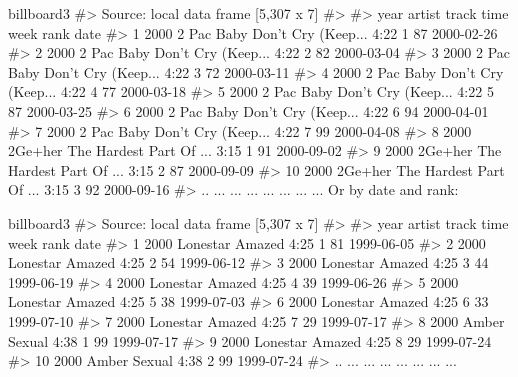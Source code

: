 billboard3 %
#> Source: local data frame [5,307 x 7]
#> 
#>    year  artist                   track time week rank       date
#> 1  2000   2 Pac Baby Don't Cry (Keep... 4:22    1   87 2000-02-26
#> 2  2000   2 Pac Baby Don't Cry (Keep... 4:22    2   82 2000-03-04
#> 3  2000   2 Pac Baby Don't Cry (Keep... 4:22    3   72 2000-03-11
#> 4  2000   2 Pac Baby Don't Cry (Keep... 4:22    4   77 2000-03-18
#> 5  2000   2 Pac Baby Don't Cry (Keep... 4:22    5   87 2000-03-25
#> 6  2000   2 Pac Baby Don't Cry (Keep... 4:22    6   94 2000-04-01
#> 7  2000   2 Pac Baby Don't Cry (Keep... 4:22    7   99 2000-04-08
#> 8  2000 2Ge+her The Hardest Part Of ... 3:15    1   91 2000-09-02
#> 9  2000 2Ge+her The Hardest Part Of ... 3:15    2   87 2000-09-09
#> 10 2000 2Ge+her The Hardest Part Of ... 3:15    3   92 2000-09-16
#> ..  ...     ...                     ...  ...  ...  ...        ...
Or by date and rank:

billboard3 %
#> Source: local data frame [5,307 x 7]
#> 
#>    year   artist  track time week rank       date
#> 1  2000 Lonestar Amazed 4:25    1   81 1999-06-05
#> 2  2000 Lonestar Amazed 4:25    2   54 1999-06-12
#> 3  2000 Lonestar Amazed 4:25    3   44 1999-06-19
#> 4  2000 Lonestar Amazed 4:25    4   39 1999-06-26
#> 5  2000 Lonestar Amazed 4:25    5   38 1999-07-03
#> 6  2000 Lonestar Amazed 4:25    6   33 1999-07-10
#> 7  2000 Lonestar Amazed 4:25    7   29 1999-07-17
#> 8  2000    Amber Sexual 4:38    1   99 1999-07-17
#> 9  2000 Lonestar Amazed 4:25    8   29 1999-07-24
#> 10 2000    Amber Sexual 4:38    2   99 1999-07-24
#> ..  ...      ...    ...  ...  ...  ...        ...
